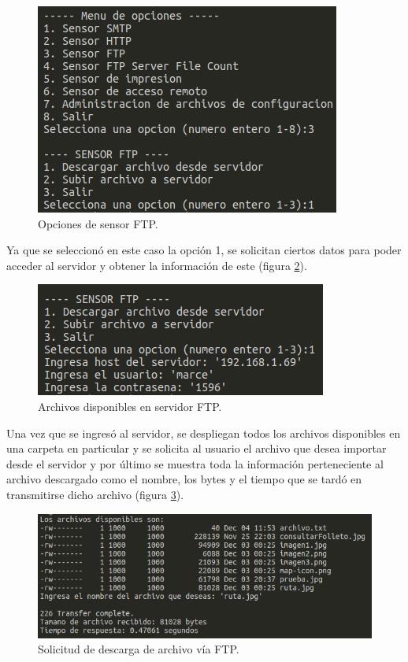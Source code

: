 \FloatBarrier
\begin{figure}[htbp!]
		\centering
			\includegraphics[width=.6 \textwidth]{images/ftp4}
		\caption{Opciones de sensor FTP.}
		\label{image:ftp4}
\end{figure}
\FloatBarrier
Ya que se seleccionó en este caso la opción 1, se solicitan ciertos datos para poder acceder al servidor y obtener la información de este (figura \ref{image:ftp6}).
\FloatBarrier
\begin{figure}[htbp!]
		\centering
			\includegraphics[width=.6 \textwidth]{images/ftp6}
		\caption{Archivos disponibles en servidor FTP.}
		\label{image:ftp6}
\end{figure}
\FloatBarrier
Una vez que se ingresó al servidor, se despliegan todos los archivos disponibles en una carpeta en particular y se solicita al usuario el archivo que desea importar desde el servidor y por último se muestra toda la información perteneciente al archivo descargado como el nombre, los bytes y el tiempo que se tardó en transmitirse dicho archivo (figura \ref{image:ftp7}).
\FloatBarrier
\begin{figure}[htbp!]
		\centering
			\includegraphics[width=.75 \textwidth]{images/ftp7}
		\caption{Solicitud de descarga de archivo vía FTP.}
		\label{image:ftp7}
\end{figure}
\FloatBarrier

